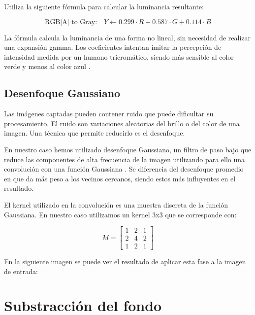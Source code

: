 Utiliza la siguiente fórmula para calcular la luminancia resultante:

\begin{equation*}
    \text{RGB[A] to Gray:} \quad Y \leftarrow 0.299 \cdot R + 0.587 \cdot G + 0.114 \cdot B
\end{equation*}

La fórmula calcula la luminancia de una forma no lineal, sin necesidad
de realizar una expansión gamma. Los coeficientes intentan imitar la
percepción de intensidad medida por un humano tricromático, siendo más
sensible al color verde y menos al color azul \citep{wiki:grayscale}.

\subsection{Desenfoque Gaussiano}\label{desenfoque-gaussiano}

Las imágenes captadas pueden contener ruido que puede dificultar su
procesamiento. El ruido son variaciones aleatorias del brillo o del
color de una imagen. Una técnica que permite reducirlo es el desenfoque.

En nuestro caso hemos utilizado desenfoque Gaussiano, un filtro de paso
bajo que reduce las componentes de alta frecuencia de la imagen
utilizando para ello una convolución con una función Gaussiana
\citep{wiki:gaussian}. Se diferencia del desenfoque promedio en que da
más peso a los vecinos cercanos, siendo estos más influyentes en el
resultado.

El kernel utilizado en la convolución es una muestra discreta de la
función Gaussiana. En nuestro caso utilizamos un kernel 3x3 que se
corresponde con: \citep{book:mastering_opencv}

\begin{equation*}
    M = 
    \begin{bmatrix}
    1 & 2 & 1 \\[0.3em] 
    2 & 4 & 2 \\[0.3em] 
    1 & 2 & 1
    \end{bmatrix}
\end{equation*}

En la siguiente imagen se puede ver el resultado de aplicar esta fase a
la imagen de entrada:


\section{Substracción del fondo}\label{substraccion-del-fondo}

